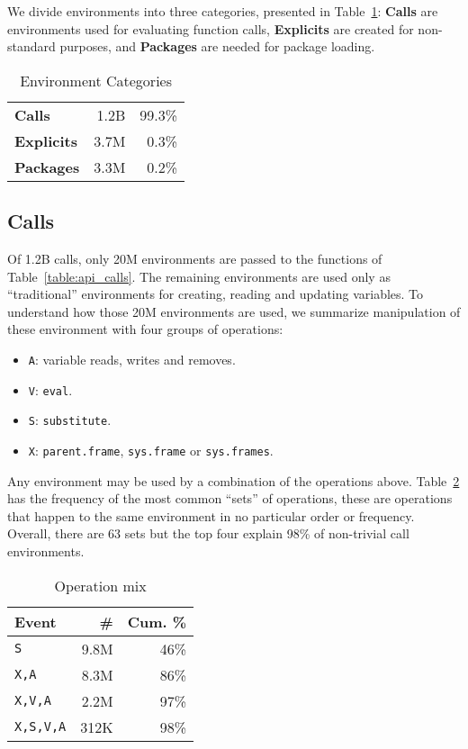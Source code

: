 \documentclass[10pt,review,sigplan,authorversion=true]{acmart}
\renewcommand{\c}[1]{\lstinline |#1|\xspace}
\newcommand{\eval}{\c{eval}}
\newcommand{\substitute}{\c{substitute}}
\begin{document}
We divide environments into three categories, presented in
Table~\ref{table:env_category}: \textbf{Calls} are environments used for
evaluating function calls, \textbf{Explicits} are created for non-standard
purposes, and \textbf{Packages} are needed for package loading.

\begin{table}[!h] \small
  \caption{Environment Categories} \label{table:env_category}\centering
  \begin{tabular}{lrr}\toprule
     \textbf{Calls}&     1.2B& 99.3\%\\
    \textbf{Explicits}& 3.7M& 0.3\%\\
    \textbf{Packages}&  3.3M& 0.2\%\\\bottomrule
  \end{tabular}
\end{table}


\subsection{Calls}

Of 1.2B calls, only 20M environments are passed to the functions of
Table~\ref{table:api_calls}. The remaining environments are used only as
``traditional'' environments for creating, reading and updating variables. To
understand how those 20M environments are used, we summarize manipulation
of these environment with four groups of operations:

\begin{itemize}
\item \texttt{A}: variable reads, writes and removes.
\item \texttt{V}: \eval.
\item \texttt{S}:  \substitute.
\item \texttt{X}:  \c{parent.frame}, \c{sys.frame} or \c{sys.frames}.
\end{itemize}

\noindent
Any environment may be used by a combination of the operations above.
Table~\ref{table:call_env_seq} has the frequency of the most common ``sets'' of
operations, these are operations that happen to the same environment in no
particular order or frequency. Overall, there are 63 sets but the top four
explain 98\% of non-trivial call environments.

\begin{table}[!h]  \small
  \caption{Operation mix} \label{table:call_env_seq}  \centering
  \begin{tabular}{lrr}    \toprule
    \textbf{Event}&\textbf{\#}&\textbf{Cum. \%}\\\midrule
    \texttt{S}&          9.8M & 46\%\\
    \texttt{X,A}&        8.3M & 86\%\\
    \texttt{X,V,A}&      2.2M & 97\%\\
    \texttt{X,S,V,A}   & 312K & 98\%\\\bottomrule
  \end{tabular}
\end{table}
\end{document}
